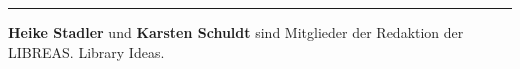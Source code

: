 \begin{center}\rule{3in}{0.4pt}\end{center}

\textbf{Heike Stadler} und \textbf{Karsten Schuldt} sind Mitglieder der
Redaktion der LIBREAS. Library Ideas.
